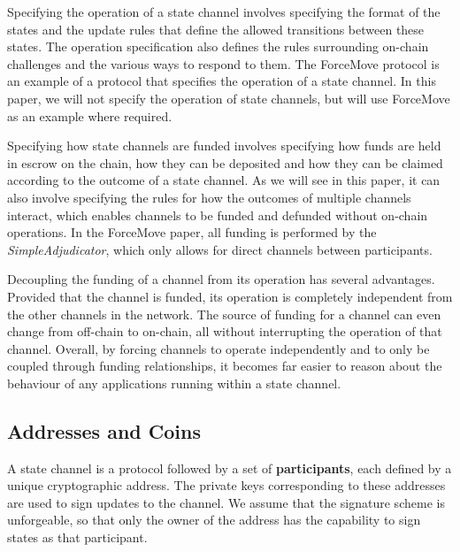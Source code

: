 \documentclass{article}
\begin{document}
Specifying the operation of a state channel involves specifying the format of the states and the update rules that define the allowed transitions between these states.
The operation specification also defines the rules surrounding on-chain challenges and the various ways to respond to them.
The ForceMove protocol is an example of a protocol that specifies the operation of a state channel.
In this paper, we will not specify the operation of state channels, but will use ForceMove as an example where required.

Specifying how state channels are funded involves specifying how funds are held in escrow on the chain, how they can be deposited and how they can be claimed according to the outcome of a state channel.
As we will see in this paper, it can also involve specifying the rules for how the outcomes of multiple channels interact, which enables channels to be funded and defunded without on-chain operations.
In the ForceMove paper, all funding is performed by the \textit{SimpleAdjudicator}, which only allows for direct channels between participants.

Decoupling the funding of a channel from its operation has several advantages.
Provided that the channel is funded, its operation is completely independent from the other channels in the network.
The source of funding for a channel can even change from off-chain to on-chain, all without interrupting the operation of that channel.
Overall, by forcing channels to operate independently and to only be coupled through funding relationships, it becomes far easier to reason about the behaviour of any applications running within a state channel.


\subsection{Addresses and Coins}

A state channel is a protocol followed by a set of \textbf{participants}, each defined by a unique cryptographic address.
The private keys corresponding to these addresses are used to sign updates to the channel.
We assume that the signature scheme is unforgeable, so that only the owner of the address has the capability to sign states as that participant.
\end{document}
